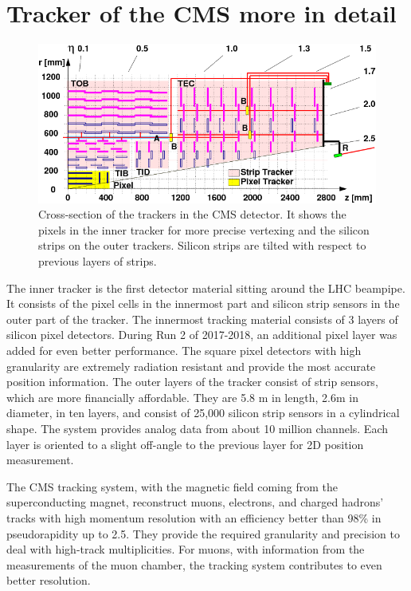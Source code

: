 \section{Tracker of the CMS more in detail}
\begin{figure}[h!]
	\caption{Cross-section of the trackers in the CMS detector. It shows the pixels in the inner tracker for more precise vertexing and the silicon strips on the outer trackers. Silicon strips are tilted with respect to previous layers of strips. \cite{trk}}
  \label{fig:tracker}
  \centering
  \includegraphics[width=0.9\linewidth]{figs/Tracker.png}
\end{figure}

The inner tracker is the first detector material sitting around the LHC beampipe.
It consists of the pixel cells in the innermost part and silicon strip sensors in the outer part of the tracker.
The innermost tracking material consists of 3 layers of silicon pixel detectors.
During Run 2 of 2017-2018, an additional pixel layer was added for even better performance.
The square pixel detectors with high granularity are extremely radiation resistant and provide the most accurate position information.
The outer layers of the tracker consist of strip sensors, which are more financially affordable.
They are 5.8 m in length, 2.6m in diameter, in ten layers, and consist of 25,000 silicon strip sensors in a cylindrical shape.
The system provides analog data from about 10 million channels.
Each layer is oriented to a slight off-angle to the previous layer for 2D position measurement.

The CMS tracking system, with the magnetic field coming from the superconducting magnet, reconstruct muons, electrons, and charged hadrons' tracks with high momentum resolution with an efficiency better than 98\% in pseudorapidity up to 2.5.
They provide the required granularity and precision to deal with high-track multiplicities.
For muons, with information from the measurements of the muon chamber, the tracking system contributes to even better resolution.

